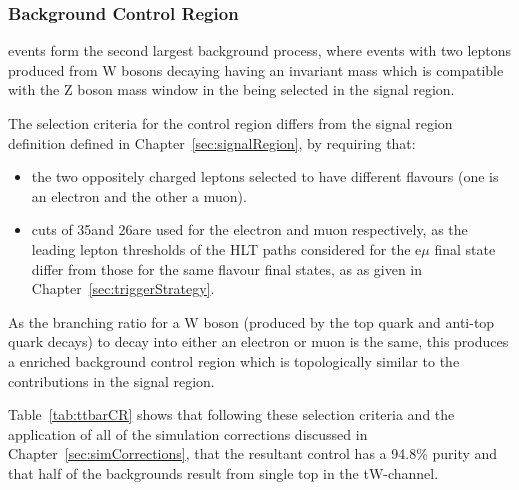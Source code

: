 \subsubsection{\ttbar Background Control Region}\label{subsec:ttbarCR}
\ttbar events form the second largest background process, where events with two leptons produced from W bosons decaying having an invariant mass which is compatible with the Z boson mass window in the being selected in the signal region.

The selection criteria for the \ttbar control region differs from the signal region definition defined in Chapter~\ref{sec:signalRegion}, by requiring that:
\begin{itemize}
\item the two oppositely charged leptons selected to have different flavours (\ie one is an electron and the other a muon).
\item \pt cuts of 35\GeV and 26\GeV are used for the electron and muon respectively, as the leading lepton \pt thresholds of the HLT paths considered for the e$\mu$ final state differ from those for the same flavour final states, as as given in Chapter~\ref{sec:triggerStrategy}. 
\end{itemize} 

As the branching ratio for a W boson (produced by the top quark and anti-top quark decays) to decay into either an electron or muon is the same, this produces a \ttbar enriched background control region which is topologically similar to the \ttbar contributions in the signal region. 

Table~\ref{tab:ttbarCR} shows that following these selection criteria and the application of all of the simulation corrections discussed in Chapter~\ref{sec:simCorrections}, that the resultant control has a 94.8\% purity and that half of the backgrounds result from single top in the tW-channel.

